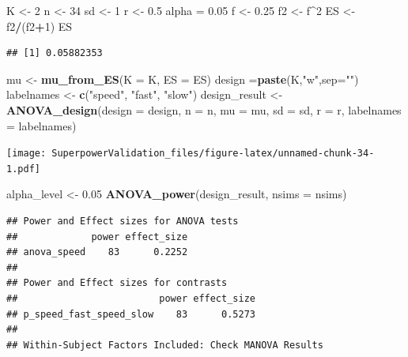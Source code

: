 \documentclass[]{book}
\newenvironment{Shaded}{\begin{snugshade}}{\end{snugshade}}
\newcommand{\DataTypeTok}[1]{\textcolor[rgb]{0.13,0.29,0.53}{#1}}
\newcommand{\DecValTok}[1]{\textcolor[rgb]{0.00,0.00,0.81}{#1}}
\newcommand{\FloatTok}[1]{\textcolor[rgb]{0.00,0.00,0.81}{#1}}
\newcommand{\KeywordTok}[1]{\textcolor[rgb]{0.13,0.29,0.53}{\textbf{#1}}}
\newcommand{\NormalTok}[1]{#1}
\newcommand{\OperatorTok}[1]{\textcolor[rgb]{0.81,0.36,0.00}{\textbf{#1}}}
\newcommand{\StringTok}[1]{\textcolor[rgb]{0.31,0.60,0.02}{#1}}
\begin{document}
\begin{Shaded}
\begin{Highlighting}[]
\NormalTok{K <-}\StringTok{ }\DecValTok{2}
\NormalTok{n <-}\StringTok{ }\DecValTok{34}
\NormalTok{sd <-}\StringTok{ }\DecValTok{1}
\NormalTok{r <-}\StringTok{ }\FloatTok{0.5}
\NormalTok{alpha =}\StringTok{ }\FloatTok{0.05}
\NormalTok{f <-}\StringTok{ }\FloatTok{0.25}
\NormalTok{f2 <-}\StringTok{ }\NormalTok{f}\OperatorTok{^}\DecValTok{2}
\NormalTok{ES <-}\StringTok{ }\NormalTok{f2}\OperatorTok{/}\NormalTok{(f2}\OperatorTok{+}\DecValTok{1}\NormalTok{)}
\NormalTok{ES}
\end{Highlighting}
\end{Shaded}

\begin{verbatim}
## [1] 0.05882353
\end{verbatim}

\begin{Shaded}
\begin{Highlighting}[]
\NormalTok{mu <-}\StringTok{ }\KeywordTok{mu_from_ES}\NormalTok{(}\DataTypeTok{K =}\NormalTok{ K, }\DataTypeTok{ES =}\NormalTok{ ES)}
\NormalTok{design =}\KeywordTok{paste}\NormalTok{(K,}\StringTok{"w"}\NormalTok{,}\DataTypeTok{sep=}\StringTok{""}\NormalTok{)}
\NormalTok{labelnames <-}\StringTok{ }\KeywordTok{c}\NormalTok{(}\StringTok{"speed"}\NormalTok{, }\StringTok{"fast"}\NormalTok{, }\StringTok{"slow"}\NormalTok{)}
\NormalTok{design_result <-}\StringTok{ }\KeywordTok{ANOVA_design}\NormalTok{(}\DataTypeTok{design =}\NormalTok{ design,}
                   \DataTypeTok{n =}\NormalTok{ n, }
                   \DataTypeTok{mu =}\NormalTok{ mu, }
                   \DataTypeTok{sd =}\NormalTok{ sd, }
                   \DataTypeTok{r =}\NormalTok{ r, }
                   \DataTypeTok{labelnames =}\NormalTok{ labelnames)}
\end{Highlighting}
\end{Shaded}

\texttt{[image: SuperpowerValidation\_files/figure-latex/unnamed-chunk-34-1.pdf]}

\begin{Shaded}
\begin{Highlighting}[]
\NormalTok{alpha_level <-}\StringTok{ }\FloatTok{0.05}
\KeywordTok{ANOVA_power}\NormalTok{(design_result, }\DataTypeTok{nsims =}\NormalTok{ nsims)}
\end{Highlighting}
\end{Shaded}

\begin{verbatim}
## Power and Effect sizes for ANOVA tests
##             power effect_size
## anova_speed    83      0.2252
## 
## Power and Effect sizes for contrasts
##                         power effect_size
## p_speed_fast_speed_slow    83      0.5273
## 
## Within-Subject Factors Included: Check MANOVA Results
\end{verbatim}
\end{document}
